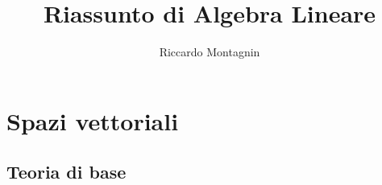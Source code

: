 \documentclass[12pt,a4paper,oneside]{book}
\begin{document}

\title{Riassunto di Algebra Lineare}
\author{Riccardo Montagnin} 
\date{}

\maketitle

\tableofcontents




				\chapter{Spazi vettoriali}


				\section{Teoria di base}
\end{document}
